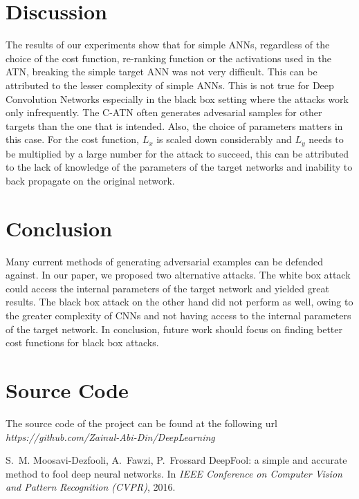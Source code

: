\documentclass[12pt, conference, letterpaper]{IEEEtran}
\begin{document}
{{{{{{{{{{{{{{\section{Discussion}
The results of our experiments show that for simple ANNs, regardless of the choice of the cost function, re-ranking function or the activations used in the ATN, breaking the simple target ANN was not very difficult. This can be attributed to the lesser complexity of simple ANNs. This is not true for Deep Convolution Networks especially in the black box setting where the attacks work only infrequently. The C-ATN often generates advesarial samples for other targets than the one that is intended. Also, the choice of parameters matters in this case. For the cost function, $L_{x}$ is scaled down considerably and $L_{y}$ needs to be multiplied by a large number for the attack to succeed, this can be attributed to the lack of knowledge of the parameters of the target networks and inability to back propagate on the original network.
\section{Conclusion}
Many current methods of generating adversarial examples can be defended against. In our paper, we proposed two alternative attacks. The white box attack could access the internal parameters of the target network and yielded great results. The black box attack on the other hand did not perform as well, owing to the greater complexity of CNNs and not having access to the internal parameters of the target network. In conclusion, future work should focus on finding better cost functions for black box attacks.
\section{Source Code}
The source code of the project can be found at the following url\\
{\itshape https://github.com/Zainul-Abi-Din/DeepLearning}











\begin{thebibliography}{10}


S.~M. Moosavi-Dezfooli, A.~Fawzi, P.~Frossard
\newblock DeepFool: a simple and accurate method to fool deep neural networks.
\newblock In {\em IEEE Conference on Computer Vision and Pattern Recognition (CVPR)}, 2016. \newline



\end{thebibliography}}}}}}}}}}}}}}}
\end{document}
